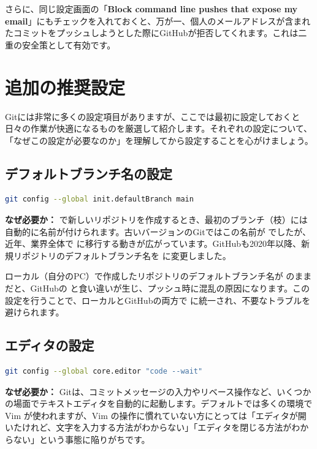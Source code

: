 さらに、同じ設定画面の「\textbf{Block command line pushes that expose my email}」にもチェックを入れておくと、万が一、個人のメールアドレスが含まれたコミットをプッシュしようとした際にGitHubが拒否してくれます。これは二重の安全策として有効です。

\section{追加の推奨設定}

Gitには非常に多くの設定項目がありますが、ここでは最初に設定しておくと日々の作業が快適になるものを厳選して紹介します。それぞれの設定について、「なぜこの設定が必要なのか」を理解してから設定することを心がけましょう。

\subsection{デフォルトブランチ名の設定}

\begin{lstlisting}[language=bash]
git config --global init.defaultBranch main
\end{lstlisting}

\textbf{なぜ必要か：}  で新しいリポジトリを作成するとき、最初のブランチ（枝）には自動的に名前が付けられます。古いバージョンのGitではこの名前が  でしたが、近年、業界全体で  に移行する動きが広がっています。GitHubも2020年以降、新規リポジトリのデフォルトブランチ名を  に変更しました。

ローカル（自分のPC）で作成したリポジトリのデフォルトブランチ名が  のままだと、GitHubの  と食い違いが生じ、プッシュ時に混乱の原因になります。この設定を行うことで、ローカルとGitHubの両方で  に統一され、不要なトラブルを避けられます。

\subsection{エディタの設定}

\begin{lstlisting}[language=bash]
git config --global core.editor "code --wait"
\end{lstlisting}

\textbf{なぜ必要か：} Gitは、コミットメッセージの入力やリベース操作など、いくつかの場面でテキストエディタを自動的に起動します。デフォルトでは多くの環境で Vim が使われますが、Vim の操作に慣れていない方にとっては「エディタが開いたけれど、文字を入力する方法がわからない」「エディタを閉じる方法がわからない」という事態に陥りがちです。

